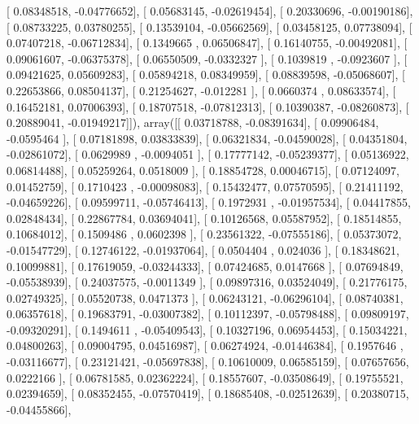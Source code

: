 \documentclass{article}
\begin{document}
       [ 0.08348518, -0.04776652],
       [ 0.05683145, -0.02619454],
       [ 0.20330696, -0.00190186],
       [ 0.08733225,  0.03780255],
       [ 0.13539104, -0.05662569],
       [ 0.03458125,  0.07738094],
       [ 0.07407218, -0.06712834],
       [ 0.1349665 ,  0.06506847],
       [ 0.16140755, -0.00492081],
       [ 0.09061607, -0.06375378],
       [ 0.06550509, -0.0332327 ],
       [ 0.1039819 , -0.0923607 ],
       [ 0.09421625,  0.05609283],
       [ 0.05894218,  0.08349959],
       [ 0.08839598, -0.05068607],
       [ 0.22653866,  0.08504137],
       [ 0.21254627, -0.012281  ],
       [ 0.0660374 ,  0.08633574],
       [ 0.16452181,  0.07006393],
       [ 0.18707518, -0.07812313],
       [ 0.10390387, -0.08260873],
       [ 0.20889041, -0.01949217]]), array([[ 0.03718788, -0.08391634],
       [ 0.09906484, -0.0595464 ],
       [ 0.07181898,  0.03833839],
       [ 0.06321834, -0.04590028],
       [ 0.04351804, -0.02861072],
       [ 0.0629989 , -0.0094051 ],
       [ 0.17777142, -0.05239377],
       [ 0.05136922,  0.06814488],
       [ 0.05259264,  0.0518009 ],
       [ 0.18854728,  0.00046715],
       [ 0.07124097,  0.01452759],
       [ 0.1710423 , -0.00098083],
       [ 0.15432477,  0.07570595],
       [ 0.21411192, -0.04659226],
       [ 0.09599711, -0.05746413],
       [ 0.1972931 , -0.01957534],
       [ 0.04417855,  0.02848434],
       [ 0.22867784,  0.03694041],
       [ 0.10126568,  0.05587952],
       [ 0.18514855,  0.10684012],
       [ 0.1509486 ,  0.0602398 ],
       [ 0.23561322, -0.07555186],
       [ 0.05373072, -0.01547729],
       [ 0.12746122, -0.01937064],
       [ 0.0504404 ,  0.024036  ],
       [ 0.18348621,  0.10099881],
       [ 0.17619059, -0.03244333],
       [ 0.07424685,  0.0147668 ],
       [ 0.07694849, -0.05538939],
       [ 0.24037575, -0.0011349 ],
       [ 0.09897316,  0.03524049],
       [ 0.21776175,  0.02749325],
       [ 0.05520738,  0.0471373 ],
       [ 0.06243121, -0.06296104],
       [ 0.08740381,  0.06357618],
       [ 0.19683791, -0.03007382],
       [ 0.10112397, -0.05798488],
       [ 0.09809197, -0.09320291],
       [ 0.1494611 , -0.05409543],
       [ 0.10327196,  0.06954453],
       [ 0.15034221,  0.04800263],
       [ 0.09004795,  0.04516987],
       [ 0.06274924, -0.01446384],
       [ 0.1957646 , -0.03116677],
       [ 0.23121421, -0.05697838],
       [ 0.10610009,  0.06585159],
       [ 0.07657656,  0.0222166 ],
       [ 0.06781585,  0.02362224],
       [ 0.18557607, -0.03508649],
       [ 0.19755521,  0.02394659],
       [ 0.08352455, -0.07570419],
       [ 0.18685408, -0.02512639],
       [ 0.20380715, -0.04455866],
\end{document}
